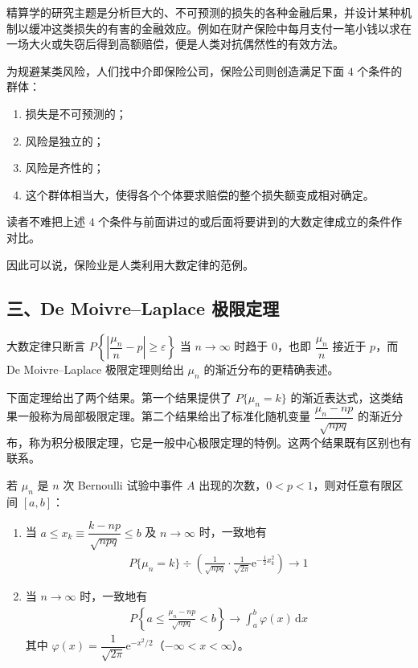 \documentclass[../../main.tex]{subfiles}
\begin{document}
精算学的研究主题是分析巨大的、不可预测的损失的各种金融后果，并设计某种机制以缓冲这类损失的有害的金融效应。例如在财产保险中每月支付一笔小钱以求在一场大火或失窃后得到高额赔偿，便是人类对抗偶然性的有效方法。

为规避某类风险，人们找中介即保险公司，保险公司则创造满足下面 $4$ 个条件的群体：
\begin{enumerate}
\item 损失是不可预测的；
\item 风险是独立的；
\item 风险是齐性的；
\item 这个群体相当大，使得各个个体要求赔偿的整个损失额变成相对确定。
\end{enumerate}

读者不难把上述 $4$ 个条件与前面讲过的或后面将要讲到的大数定律成立的条件作对比。

因此可以说，保险业是人类利用大数定律的范例。

\subsection*{三、De Moivre--Laplace 极限定理}

大数定律只断言 $P\!\left\{\left|\dfrac{\mu_n}{n}-p\right|\geqslant\varepsilon\right\}$ 当 $n\to\infty$ 时趋于 $0$，也即 $\dfrac{\mu_n}{n}$ 接近于 $p$，而 De Moivre--Laplace 极限定理则给出 $\mu_n$ 的渐近分布的更精确表述。

下面定理给出了两个结果。第一个结果提供了 $P\{\mu_n=k\}$ 的渐近表达式，这类结果一般称为局部极限定理。第二个结果给出了标准化随机变量 $\dfrac{\mu_n-np}{\sqrt{npq}}$ 的渐近分布，称为积分极限定理，它是一般中心极限定理的特例。这两个结果既有区别也有联系。

\begin{theorem}\label{theorem:ch05-DeMoivreLaplace}
若 $\mu_n$ 是 $n$ 次 Bernoulli 试验中事件 $A$ 出现的次数，$0<p<1$，则对任意有限区间 $[a,b]$：
\begin{enumerate}
\item 当 $a\leqslant x_k\equiv\dfrac{k-np}{\sqrt{npq}}\leqslant b$ 及 $n\to\infty$ 时，一致地有
\begin{align}
P\{\mu_n=k\}\div\left(\frac{1}{\sqrt{npq}}\cdot\frac{1}{\sqrt{2\pi}}\mathrm{e}^{-\frac12 x_k^{2}}\right)\to 1
\end{align}
\item 当 $n\to\infty$ 时，一致地有
\begin{align}
P\!\left\{a\leqslant\frac{\mu_n-np}{\sqrt{npq}}<b\right\}\to\int_{a}^{b}\varphi(x)\,\mathrm{d}x
\end{align}
其中 $\varphi(x)=\dfrac{1}{\sqrt{2\pi}}\mathrm{e}^{-x^{2}/2}$（$-\infty<x<\infty$）。
\end{enumerate}
\end{theorem}
\end{document}
